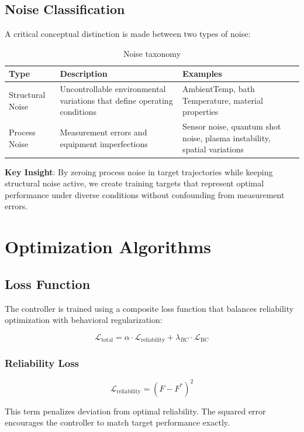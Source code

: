 \documentclass[11pt,a4paper]{article}
\begin{document}
\subsection{Noise Classification}

A critical conceptual distinction is made between two types of noise:

\begin{table}[h!]
\centering
\begin{tabular}{@{}lp{5cm}p{5cm}@{}}
\toprule
\textbf{Type} & \textbf{Description} & \textbf{Examples} \\ \midrule
Structural Noise & Uncontrollable environmental variations that define operating conditions & AmbientTemp, bath Temperature, material properties \\
Process Noise & Measurement errors and equipment imperfections & Sensor noise, quantum shot noise, plasma instability, spatial variations \\ \bottomrule
\end{tabular}
\caption{Noise taxonomy}
\end{table}

\textbf{Key Insight}: By zeroing process noise in target trajectories while keeping structural noise active, we create training targets that represent optimal performance under diverse conditions without confounding from measurement errors.

\section{Optimization Algorithms}

\subsection{Loss Function}

The controller is trained using a composite loss function that balances reliability optimization with behavioral regularization:

$$
\mathcal{L}_{\text{total}} = \alpha \cdot \mathcal{L}_{\text{reliability}} + \lambda_{BC} \cdot \mathcal{L}_{\text{BC}}
$$

\subsubsection{Reliability Loss}

$$
\mathcal{L}_{\text{reliability}} = (F - F^*)^2
$$

This term penalizes deviation from optimal reliability. The squared error encourages the controller to match target performance exactly.
\end{document}
